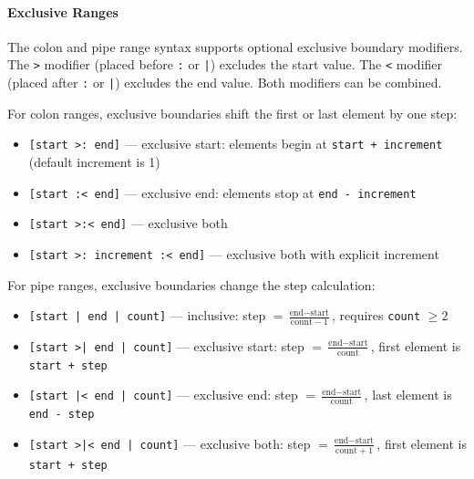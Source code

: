\paragraph{Exclusive Ranges}
The colon and pipe range syntax supports optional exclusive boundary modifiers. The \texttt{>} modifier (placed before \texttt{:} or \texttt{|}) excludes the start value. The \texttt{<} modifier (placed after \texttt{:} or \texttt{|}) excludes the end value. Both modifiers can be combined.

For colon ranges, exclusive boundaries shift the first or last element by one step:
\begin{itemize}
\item \texttt{[start >: end]} --- exclusive start: elements begin at \texttt{start + increment} (default increment is 1)
\item \texttt{[start :< end]} --- exclusive end: elements stop at \texttt{end - increment}
\item \texttt{[start >:< end]} --- exclusive both
\item \texttt{[start >: increment :< end]} --- exclusive both with explicit increment
\end{itemize}

For pipe ranges, exclusive boundaries change the step calculation:
\begin{itemize}
\item \texttt{[start | end | count]} --- inclusive: step $= \frac{\text{end} - \text{start}}{\text{count} - 1}$, requires \texttt{count} $\geq 2$
\item \texttt{[start >| end | count]} --- exclusive start: step $= \frac{\text{end} - \text{start}}{\text{count}}$, first element is \texttt{start + step}
\item \texttt{[start |< end | count]} --- exclusive end: step $= \frac{\text{end} - \text{start}}{\text{count}}$, last element is \texttt{end - step}
\item \texttt{[start >|< end | count]} --- exclusive both: step $= \frac{\text{end} - \text{start}}{\text{count} + 1}$, first element is \texttt{start + step}
\end{itemize}

